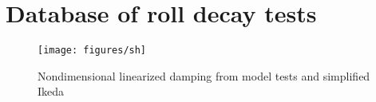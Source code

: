 \section{Database of roll decay tests}
\label{se:database_of_roll_decay_tests}

\begin{figure}[H]
    \centering
    \texttt{[image: figures/sh]}
    \caption{Nondimensional linearized damping from model tests and simplified Ikeda}
    \label{fig:B_e_hat_ikeda}
\end{figure}